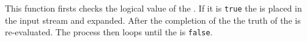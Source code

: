 \documentclass[oneside]{book}
\begin{document}
\begin{function}{\BoolVarWhileDo}
\begin{syntax}
  
\end{syntax}
This function firsts checks the logical value of the .
If it is \texttt{true} the  is placed in the input stream
and expanded. After the completion of the  the truth
of the  is re-evaluated. The process then loops
until the  is \texttt{false}.
\begin{demohigh}
\IgnoreSpacesOn
\BoolSetTrue \lTmpaBool
\IntZero \lTmpaInt
\ClistClear \lTmpaClist
\BoolVarWhileDo {}
\ClistVarJoin \lTmpaClist {:}
\IgnoreSpacesOff
\end{demohigh}
\end{function}
\end{document}
